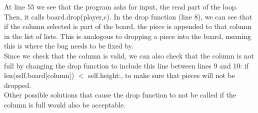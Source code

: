 At line 55 we see that the program asks for input, the read part of the loop.
Then, it calls board.drop(player,c).
In the drop function (line 8), we can see that if the column selected is part of the board,
	the piece is appended to that column in the list of lists.
This is analogous to dropping a piece into the board, meaning this is where the bug needs to be fixed by.\\

Since we check that the column is valid,
	we can also check that the column is not full by changing the drop function to include this line between lines 9 and 10:
if len(self.board[column]) $<$ self.height:, to make sure that pieces will not be dropped.\\

Other possible solutions that cause the drop function to not be called if the column is full would also be acceptable.

\newpage